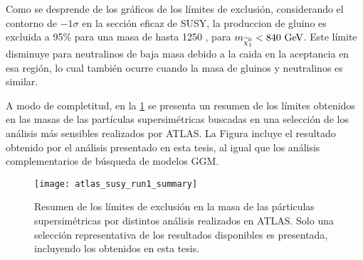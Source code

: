Como se desprende de los gráficos de los límites de exclusión, considerando
el contorno de $-1\sigma$ en la sección eficaz de SUSY,
la produccion de
gluino es excluida a 95\% {\cl} para una masa de hasta 1250 \gev,
para $m_{\ninoone}<{840}\gev$. Este límite disminuye para neutralinos
de baja masa debido a la caida en la aceptancia en esa región, lo cual también ocurre
cuando la masa de gluinos y neutralinos es similar.

A modo de completitud, en la \cref{fig:susy_summary} se presenta un resumen de los límites obtenidos en
las masas de las partículas supersimétricas buscadas en una selección de los
análisis más sensibles realizados por ATLAS. La Figura incluye el resultado obtenido
por el análisis presentado en esta tesis, al igual que los análisis
complementarios de búsqueda de modelos GGM.


\begin{figure}[!htb]
  \centering

  \texttt{[image: atlas\_susy\_run1\_summary]}

  \caption{Resumen de los límites de exclusión en la masa de las párticulas
    supersimétricas por distintos análisis realizados en ATLAS. Solo una
    selección representativa de los resultados disponibles es
    presentada\cite{susy_summary}, incluyendo los obtenidos en esta tesis.}
  \label{fig:susy_summary}

\end{figure}
